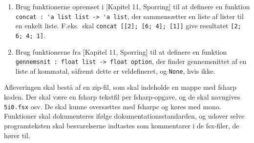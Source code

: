 \documentclass[a4paper,12pt]{article}
\begin{document}
\begin{enumerate}[label=5i.\arabic*,start=0]
\begin{enumerate}
\end{enumerate}
\item Brug funktionerne opremset i [Kapitel 11, Sporring] til at definere en funktion \lstinline{concat : 'a list list -> 'a list}, der sammensætter en liste af lister til en enkelt liste.  F.eks.\ skal \lstinline{concat [[2]; [6; 4]; [1]]} give resultatet \lstinline{[2; 6; 4; 1]}.
\item Brug funktionerne fra [Kapitel 11, Sporring]  til at definere en funktion \lstinline{gennemsnit : float list -> float option}, der finder gennemsnittet af en liste af kommatal, såfremt dette er veldefineret, og \lstinline{None}, hvis ikke.
\end{enumerate}

Afleveringen skal bestå af en zip-fil, som skal indeholde en mappe med fsharp koden. Der skal være en fsharp tekstfil per fsharp-opgave, og de skal navngives \verb|5i0.fsx| osv. De skal kunne oversættes med fsharpc og køres med mono. Funktioner skal dokumenteres ifølge dokumentationsstandarden, og udover selve programteksten skal besvarelserne indtastes som kommentarer i de fsx-filer, de hører til.
\end{document}
